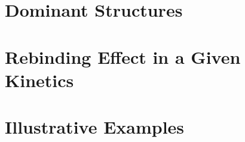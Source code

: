 \documentclass[
  11pt,
  a4paper,
  pdftex,
  twoside,
  DIVcalc,
  openright
  ] {scrreprt}
\begin{document}
\chapter{Dominant Structures}\label{chap:meta}
  
  
  
  

\chapter{Rebinding Effect in a Given Kinetics}\label{chap:rebinding}
  
  
  
  

\chapter{Illustrative Examples}\label{chap:example}
  
  
  
  

    
  \newpage
  
\cleardoublepage

%	


\cleardoublepage
\newpage
{}
\setcounter{page}{5}
%
%
%
%



%  

 \clearpage
 
\end{document}
